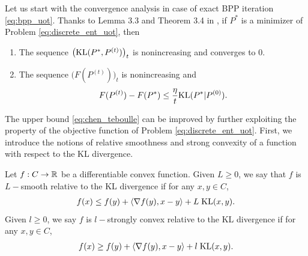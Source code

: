 Let us start with the convergence analysis in case of exact BPP iteration \ref{eq:bpp_uot}.
Thanks to Lemma 3.3 and Theorem 3.4 in \citep{Chen93}, if $P^*$ is a minimizer of
Problem \eqref{eq:discrete_ent_uot}, then
\begin{enumerate}
  \item The sequence $\big( \text{KL}(P^*, P^{(t)}) \big)_t$ is nonincreasing and converges to $0$.
  \item The sequence $\big( F(P^{(t)}) \big)_t$ is nonincreasing and
  \begin{align}
    \label{eq:chen_teboulle}
    F(P^{(t)}) - F(P^*) \leq \frac{\eta}{t} \text{KL}(P^* | P^{(0)}).
  \end{align}
\end{enumerate}
The upper bound \eqref{eq:chen_teboulle} can be improved by further exploiting the property of
the objective function of Problem \eqref{eq:discrete_ent_uot}.
First, we introduce the notions of relative smoothness \citep{Bauschke17} and
strong convexity \citep{Lu18} of a function with respect to the KL divergence.
\begin{definition}
  \label{def:smooth-convex}
  Let $f:C \to \mathbb R$ be a differentiable convex function.
  Given $L \geq 0$, we say that $f$ is $L-$smooth relative to the KL divergence
  if for any $x, y \in C$,
  \begin{align}
    f(x) \leq f(y) + \langle \nabla f(y), x - y \rangle + L \; \text{KL}(x, y).
  \end{align}
  Given $l \geq 0$, we say $f$ is $l-$strongly convex relative to the KL divergence
  if for any $x, y \in C$,
  \begin{align}
    f(x) \geq f(y) + \langle \nabla f(y), x - y \rangle + l\; \text{KL}(x, y).
  \end{align}
\end{definition}

